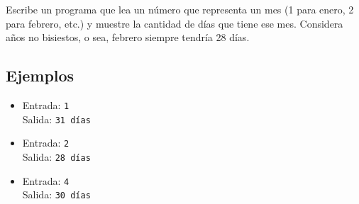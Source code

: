 Escribe un programa que lea un número que representa un mes (1 para enero, 2 para febrero, etc.) y muestre la cantidad de días que tiene ese mes. Considera años no bisiestos, o sea, febrero siempre tendría 28 días.
\subsection*{Ejemplos}
\begin{itemize}
    \item Entrada: \texttt{1}\\
          Salida: \texttt{31 días}
    \item Entrada: \texttt{2}\\
          Salida: \texttt{28 días}
    \item Entrada: \texttt{4}\\
          Salida: \texttt{30 días}
\end{itemize}